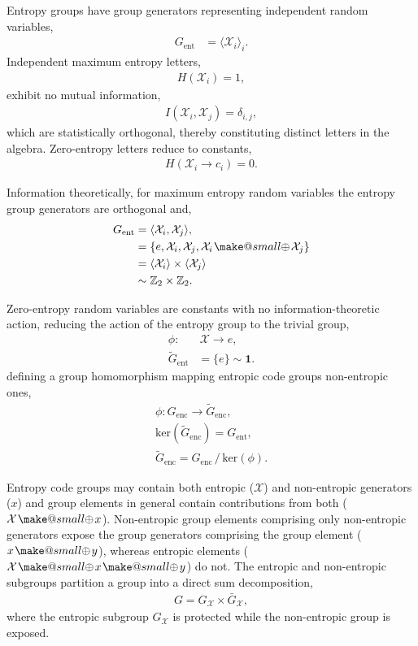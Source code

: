 \documentclass[twocolumn, aps, amsmath, amssymb, nofootinbib, superscriptaddress, longbibliography, doublefloatfix, table-of-contents, eqsecnum, rmp]{revtex4-2}
\makeatletter
\newcommand{\soplus}{{{\hspace{1pt}}{\mathbin{\mathpalette\make@small{\mathbin\oplus}}}}{\hspace{1pt}}}
\newcommand{\make@small}[2]{%
  \vcenter{\hbox{%
    \scalebox{0.6}{$\m@th#1#2$}%
  }}%
}
\makeatother
\begin{document}
Entropy groups have group generators representing independent random variables,
\begin{align}
	G_\mathrm{ent} &= \langle \mathcal{X}_i \rangle_i.
\end{align}
Independent maximum entropy letters,
\begin{align}
	H(\mathcal{X}_i) = 1,
\end{align}
exhibit no mutual information,
\begin{align}
	I(\mathcal{X}_i,\mathcal{X}_j) = \delta_{i,j},
\end{align}
which are statistically orthogonal, thereby constituting distinct letters in the algebra.
Zero-entropy letters reduce to constants,
\begin{align}
	H(\mathcal{X}_i\to c_i) = 0.
\end{align}

Information theoretically, for maximum entropy random variables the entropy group generators are orthogonal and,
\begin{align}
	G_\mathrm{ent} &= \langle \mathcal{X}_i,\mathcal{X}_j\rangle,\nonumber\\
	&= \{e,\mathcal{X}_i,\mathcal{X}_j, \mathcal{X}_i\soplus \mathcal{X}_j\} \nonumber\\
	&= \langle \mathcal{X}_i\rangle \times \langle \mathcal{X}_j\rangle \nonumber\\
	&\sim \mathbb{Z}_2 \times \mathbb{Z}_2.
\end{align}

Zero-entropy random variables are constants with no information-theoretic action, reducing the action of the entropy group to the trivial group,
\begin{align}
	\phi:&\, \mathcal{X} \to e,\nonumber\\
	{\tilde G}_\mathrm{ent} &= \{e\} \sim \mathbf{1}.
\end{align}
defining a group homomorphism mapping entropic code groups non-entropic ones,
\begin{align}
	\phi: G_\mathrm{enc} \to {\tilde G}_\mathrm{enc},\nonumber\\
	\mathrm{ker}({\tilde G}_\mathrm{enc}) = G_\mathrm{ent},\nonumber\\
	{\tilde G}_\mathrm{enc} = G_\mathrm{enc} \,/\, \mathrm{ker}(\phi).
\end{align}

Entropy code groups may contain both entropic ($\mathcal{X}$) and non-entropic generators ($x$) and group elements in general contain contributions from both ($\mathcal{X}\soplus x$). Non-entropic group elements comprising only non-entropic generators expose the group generators comprising the group element ($x\soplus y$), whereas entropic elements ($\mathcal{X}\soplus x \soplus y$) do not. The entropic and non-entropic subgroups partition a group into a direct sum decomposition,
\begin{align}
	G = G_\mathcal{X} \times \bar{G}_\mathcal{X},	
\end{align}
where the entropic subgroup $G_\mathcal{X}$ is protected while the non-entropic group is exposed.
\end{document}
